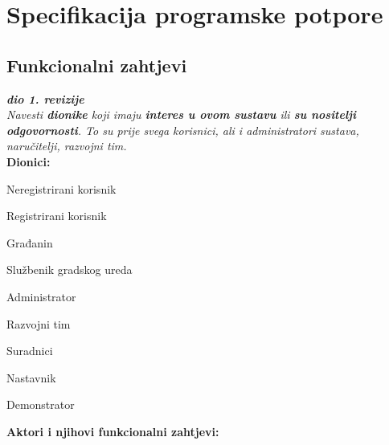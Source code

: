 \chapter{Specifikacija programske potpore}

\section{Funkcionalni zahtjevi}

\textbf{\textit{dio 1. revizije}}\\

\textit{Navesti \textbf{dionike} koji imaju \textbf{interes u ovom sustavu} ili  \textbf{su nositelji odgovornosti}. To su prije svega korisnici, ali i administratori sustava, naručitelji, razvojni tim.}\\

\noindent \textbf{Dionici:}

\begin{packed_enum}

	\item Neregistrirani korisnik
	\item Registrirani korisnik
	\begin{packed_enum}
		\item Građanin
		\item Službenik gradskog ureda
	\end{packed_enum}
	\item Administrator
	\item Razvojni tim
	\item Suradnici
	\begin{packed_enum}
		\item Nastavnik
		\item Demonstrator
	\end{packed_enum}

\end{packed_enum}

\noindent \textbf{Aktori i njihovi funkcionalni zahtjevi:}


